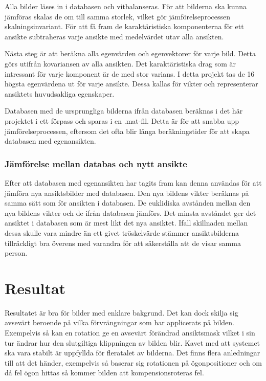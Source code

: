 \documentclass[a4paper,12pt,oneside,final]{extbook}
\begin{document}
Alla bilder läses in i databasen och vitbalanseras. För att bilderna ska kunna jämföras skalas de om till samma storlek, vilket gör jämförelseprocessen skalningsinvariant. För att få fram de karaktäristiska komponenterna för ett ansikte subtraheras varje ansikte med medelvärdet utav alla ansikten.

Nästa steg är att beräkna alla egenvärden och egenvektorer för varje bild. Detta görs utifrån kovariansen av alla ansikten. Det karaktäristiska drag som är intressant för varje komponent är de med stor varians. I detta projekt tas de 16 högsta egenvärdena ut för varje ansikte. Dessa kallas för vikter och representerar ansiktets huvudsakliga egenskaper.

Databasen med de ursprungliga bilderna ifrån databasen beräknas i det här projektet i ett förpass och sparas i en .mat-fil. Detta är för att snabba upp jämförelseprocessen, eftersom det ofta blir långa beräkningstider för att skapa databasen med egenansikten.

\subsection{Jämförelse mellan databas och nytt ansikte}

Efter att databasen med egenansikten har tagits fram kan denna användas för att jämföra nya ansiktsbilder med databasen. Den nya bildens vikter beräknas på samma sätt som för ansikten i databasen. De euklidiska avstånden mellan den nya bildens vikter och de ifrån databasen jämförs. Det minsta avståndet ger det ansiktet i databasen som är mest likt det nya ansiktet. Ifall skillnaden mellan dessa skulle vara mindre än ett givet tröskelvärde stämmer ansiktsbilderna tillräckligt bra överens med varandra för att säkerställa att de visar samma person.

\chapter{Resultat}
Resultatet är bra för bilder med enklare bakgrund. Det kan dock skilja sig avsevärt beroende på vilka förvrängningar som har applicerats på bilden. Exempelvis så kan en rotation ge en avsevärt förändrad ansiktsmask vilket i sin tur ändrar hur den slutgiltiga klippningen av bilden blir.  
Kavet med att systemet ska vara stabilt är uppfyllda för fleratalet av bilderna. Det finns flera anledningar till att det händer, exempelvis så baserar sig rotationen på ögonpositioner och om då fel ögon hittas så kommer bilden att kompensionsroteras fel. 
\end{document}
